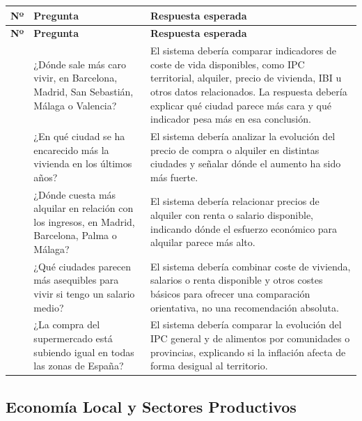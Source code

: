 \begin{longtable}{>{\raggedright\arraybackslash}p{} >{\raggedright\arraybackslash}p{} >{\raggedright\arraybackslash}p{}}
\toprule
\textbf{Nº} & \textbf{Pregunta} & \textbf{Respuesta esperada} \\
\midrule
\endfirsthead
\toprule
\textbf{Nº} & \textbf{Pregunta} & \textbf{Respuesta esperada} \\
\midrule
\endhead
6 & ¿Dónde sale más caro vivir, en Barcelona, Madrid, San Sebastián, Málaga o Valencia? & El sistema debería comparar indicadores de coste de vida disponibles, como IPC territorial, alquiler, precio de vivienda, IBI u otros datos relacionados. La respuesta debería explicar qué ciudad parece más cara y qué indicador pesa más en esa conclusión. \\
7 & ¿En qué ciudad se ha encarecido más la vivienda en los últimos años? & El sistema debería analizar la evolución del precio de compra o alquiler en distintas ciudades y señalar dónde el aumento ha sido más fuerte. \\
8 & ¿Dónde cuesta más alquilar en relación con los ingresos, en Madrid, Barcelona, Palma o Málaga? & El sistema debería relacionar precios de alquiler con renta o salario disponible, indicando dónde el esfuerzo económico para alquilar parece más alto. \\
9 & ¿Qué ciudades parecen más asequibles para vivir si tengo un salario medio? & El sistema debería combinar coste de vivienda, salarios o renta disponible y otros costes básicos para ofrecer una comparación orientativa, no una recomendación absoluta. \\
10 & ¿La compra del supermercado está subiendo igual en todas las zonas de España? & El sistema debería comparar la evolución del IPC general y de alimentos por comunidades o provincias, explicando si la inflación afecta de forma desigual al territorio. \\
\bottomrule
\end{longtable}

\subsection{Economía Local y Sectores Productivos}

